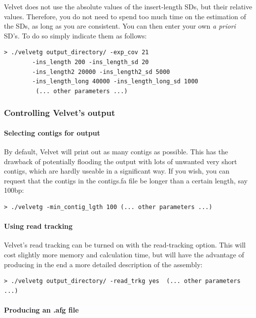 \documentclass{article}
\begin{document}
Velvet does not use the absolute values of the insert-length SDs, but their relative values. Therefore, you do not need to spend too much time on the estimation of the SDs, as long as you are consistent. You can then enter your own \emph{a priori} SD's. To do so simply indicate them as follows:

\begin{verbatim}
> ./velvetg output_directory/ -exp_cov 21 
		-ins_length 200 -ins_length_sd 20
		-ins_length2 20000 -ins_length2_sd 5000
		-ins_length_long 40000 -ins_length_long_sd 1000
		 (... other parameters ...)
\end{verbatim}

	\subsubsection{Controlling Velvet's output}

	\paragraph{Selecting contigs for output}

By default, Velvet will print out as many contigs as possible. This has the drawback of potentially flooding the output with lots of unwanted very short contigs, which are hardly useable in a significant way. If you wish, you can request that the contigs in the contigs.fa file be longer than a certain length, say 100bp:

\begin{verbatim}
> ./velvetg -min_contig_lgth 100 (... other parameters ...)
\end{verbatim}

	\paragraph{Using read tracking} 
	
Velvet's read tracking can be turned on with the read-tracking option. This will cost slightly more memory and calculation time, but will have the advantage of producing in the end a more detailed description of the assembly:

\begin{verbatim}
> ./velvetg output_directory/ -read_trkg yes  (... other parameters ...)
\end{verbatim}

	\paragraph{Producing an .afg file}
	
\end{document}
